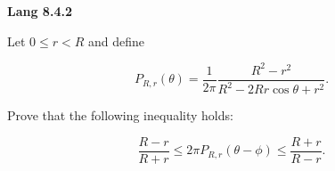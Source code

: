 \textbf{Lang 8.4.2}

Let $0 \le r < R$ and define

$$
P_{R, r}(\theta) = \frac{1}{2 \pi} \frac{R^2 - r^2}{R^2 - 2 R r \cos{\theta} + r^2}.
$$

Prove that the following inequality holds:

$$
\frac{R - r}{R + r} \le 2 \pi P_{R, r}(\theta - \phi) \le \frac{R + r}{R - r}.
$$

\begin{solution}
  \ \\
\end{solution}
